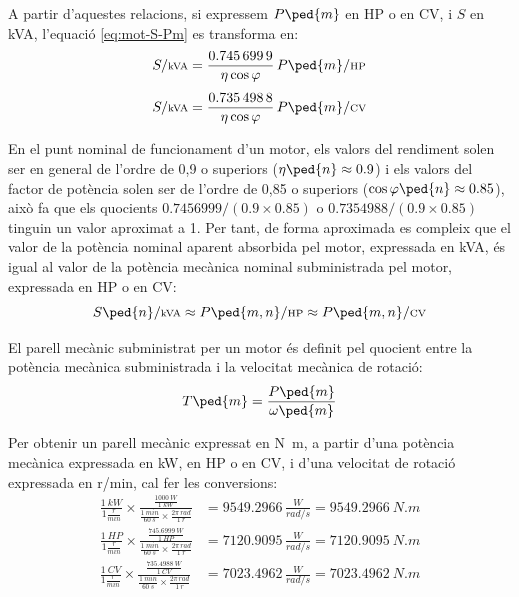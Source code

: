  A partir d'aquestes relacions, si expressem $P\ped{m}$  en HP o en CV, i $S$  en kVA, l'equació \eqref{eq:mot-S-Pm} es transforma en:
\begin{align}
    S/{\scriptstyle\unit{kVA}} &= \frac{\num{0,7456999}}{\eta \cos\varphi}\,   P\ped{m}/{\scriptstyle\unit{HP}} \\[1ex]
    S/{\scriptstyle\unit{kVA}} &= \frac{\num{0,7354988}}{\eta \cos\varphi}\,   P\ped{m}/{\scriptstyle\unit{CV}}
\end{align}

En el punt nominal de funcionament d'un motor, els valors del rendiment solen ser en general de l'ordre de 0,9 o superiors ($\eta\ped{n} \approx \num{0,9}$) i els valors del factor de potència solen ser de l'ordre de 0,85 o superiors ($\cos\varphi\ped{n} \approx \num{0,85}$), això fa que els quocients $\num{0,7456999}/(\num{0,9} \times \num{0,85})$ o $\num{0,7354988}/(\num{0,9} \times \num{0,85})$ tinguin un valor aproximat a 1. Per tant, de forma aproximada es compleix que el valor de la potència nominal aparent absorbida pel motor, expressada en kVA, és igual al valor de la potència mecànica nominal subministrada pel motor, expressada en HP o en CV:
\begin{equation}\label{eq:kVA-CV-HP}
    S\ped{n}/{\scriptstyle \unit{kVA}} \approx  P\ped{m,n}/{\scriptstyle \unit{HP}} \approx  P\ped{m,n}/{\scriptstyle \unit{CV}}
\end{equation}


El parell mecànic subministrat per un motor és definit pel quocient entre la potència mecànica subministrada i la velocitat mecànica de rotació:
\begin{equation}\index{parell!mecànic}
    T\ped{m} = \frac{P\ped{m}}{\omega\ped{m}}\label{eq:T-P-w}
\end{equation}

Per  obtenir un  parell mecànic expressat en \unit{N.m}, a partir d'una potència mecànica expressada en kW, en HP o en CV, i d'una velocitat de rotació expressada en \unit{r/min}, cal  fer les conversions:
\begin{subequations}
\begin{align}
	\frac{\qty{1}{kW}}{1\frac{\unit{r}}{\unit{min}}} \times
    \frac{\frac{\qty{1000}{W}}{\qty{1}{kW}}}{ \frac{\qty{1}{min}}{\qty{60}{s}} \times \frac{2\pi\,\unit{rad}}{\qty{1}{r}}} &=  \num{9549,2966}\, \frac{\unit{W}}{\unit{rad/s}} = \qty{9549,2966}{N.m} \\[1ex]
    \frac{\qty{1}{HP}}{1\frac{\unit{r}}{\unit{min}}} \times
    \frac{\frac{\qty{745,6999}{W}}{\qty{1}{HP}}}{ \frac{\qty{1}{min}}{\qty{60}{s}} \times \frac{2\pi\,\unit{rad}}{\qty{1}{r}}} &=  \num{7120,9095}\, \frac{\unit{W}}{\unit{rad/s}} = \qty{7120,9095}{N.m} \\[1ex]
    \frac{\qty{1}{CV}}{1\frac{\unit{r}}{\unit{min}}} \times
    \frac{\frac{\qty{735,4988}{W}}{\qty{1}{CV}}}{ \frac{\qty{1}{min}}{\qty{60}{s}} \times \frac{2\pi\,\unit{rad}}{\qty{1}{r}}} &=  \num{7023,4962}\, \frac{\unit{W}}{\unit{rad/s}} = \qty{7023,4962}{N.m}
\end{align}
\end{subequations}

